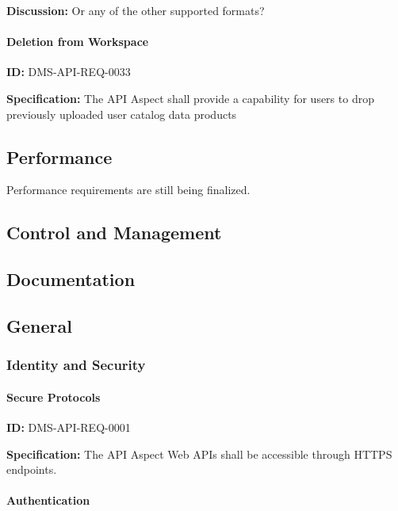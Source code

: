 \documentclass[SE,toc]{lsstdoc}
\begin{document}
\textbf{Discussion:}
Or any of the other supported formats?

\paragraph{Deletion from Workspace}\hfill  %

\label{DMS-API-REQ-0033}
\textbf{ID:} DMS-API-REQ-0033

\textbf{Specification:}
The API Aspect shall provide a capability for users to drop previously uploaded user catalog data products

\subsection{Performance}

Performance requirements are still being finalized.

\subsection{Control and Management}

\subsection{Documentation}

\subsection{General}

\subsubsection{Identity and Security}

\paragraph{Secure Protocols}\hfill  %

\label{DMS-API-REQ-0001}
\textbf{ID:} DMS-API-REQ-0001

\textbf{Specification:}
The API Aspect Web APIs shall be accessible through HTTPS endpoints.

\paragraph{Authentication}\hfill  %
\end{document}
